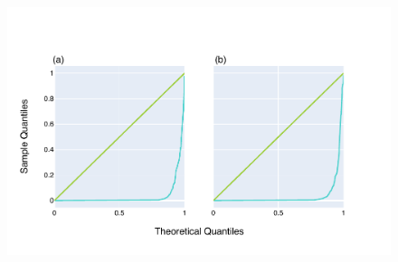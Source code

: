 \begin{figure}
\centering
\includegraphics[width=\textwidth]{figures/plots/synthetic/chi2/197113_332182_17210.pdf}
\caption{}
\label{fig:synthetic/chi2}
\end{figure}